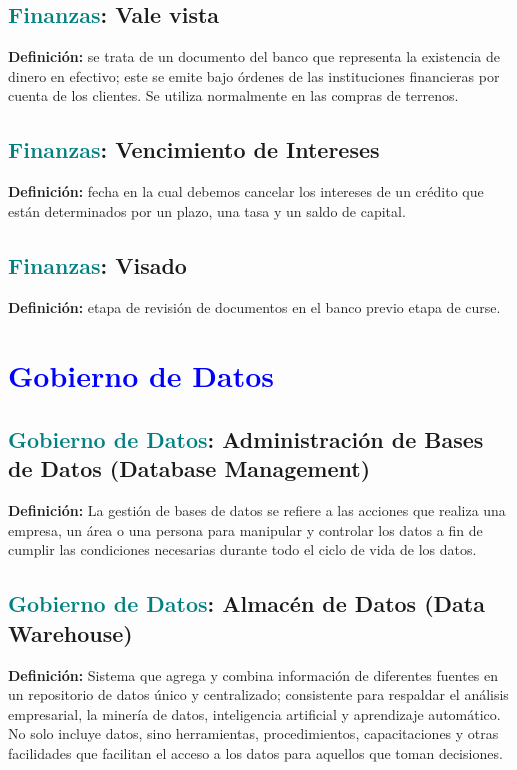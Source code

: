 \documentclass[12pt]{article}
\begin{document}
\subsection{\textcolor{teal}{Finanzas}: Vale vista}
\textbf{Definición:} se trata de un documento del banco que representa la existencia de dinero en efectivo; este se emite bajo órdenes de las instituciones financieras por cuenta de los clientes. Se utiliza normalmente en las compras de terrenos.
\subsection{\textcolor{teal}{Finanzas}: Vencimiento de Intereses}
\textbf{Definición:} fecha en la cual debemos cancelar los intereses de un crédito que están determinados por un plazo, una tasa y un saldo de capital.
\subsection{\textcolor{teal}{Finanzas}: Visado}
\textbf{Definición:} etapa de revisión de documentos en el banco previo etapa de curse.
\section{\textcolor{blue}{Gobierno de Datos}}
\subsection{\textcolor{teal}{Gobierno de Datos}: Administración de Bases de Datos (Database Management)}
\textbf{Definición:} La gestión de bases de datos se refiere a las acciones que realiza una empresa, un área o una persona para manipular y controlar los datos a fin de cumplir las condiciones necesarias durante todo el ciclo de vida de los datos.
\subsection{\textcolor{teal}{Gobierno de Datos}: Almacén de Datos (Data Warehouse)}
\textbf{Definición:} Sistema que agrega y combina información de diferentes fuentes en un repositorio de datos único y centralizado; consistente para respaldar el análisis empresarial, la minería de datos, inteligencia artificial y aprendizaje automático. No solo incluye datos, sino herramientas, procedimientos, capacitaciones y otras facilidades que facilitan el acceso a los datos para aquellos que toman decisiones.
\end{document}
